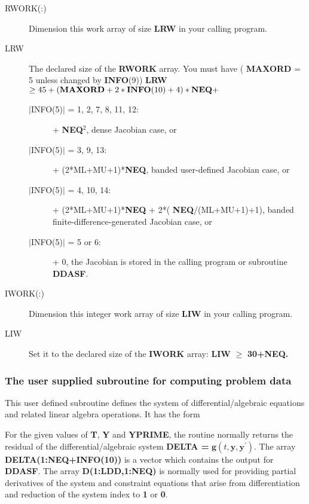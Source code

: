 \documentclass[twoside]{MATH77}
\begin{document}
\begin{description}
\item[RWORK(:)] Dimension this work array of size \textbf{LRW} in your calling
  program.
\item[LRW] The declared size of the \textbf{RWORK} array.  You must have ({\bf
    MAXORD} = 5 unless changed by {\bf INFO}(9)) \textbf{LRW} $\geq 45+({\bf
    MAXORD}+2*{\bf INFO}(10)+4)*{\bf NEQ} +$\vspace{-5pt}
  \begin{description}
  \item[$|$INFO(5)$|$ = 1, 2, 7, 8, 11, 12:] + {\bf NEQ}$^2$, dense Jacobian
    case, or
  \item[$|$INFO(5)$|$ = 3, 9, 13:]  + (2*ML+MU+1)*{\bf NEQ}, banded
    user-defined Jacobian case, or
  \item[ $|$INFO(5)$|$ = 4, 10, 14:] + (2*ML+MU+1)*{\bf NEQ} + 2*({\bf
      NEQ}/(ML+MU+1)+1), banded finite-difference-generated Jacobian case, or
  \item[$|$INFO(5)$|$ = 5 or 6:] + 0, the Jacobian is stored in the calling
    program or subroutine \textbf{DDASF}.
  \end{description}

\item[IWORK(:)] Dimension this integer work array of size
  \textbf{LIW} in your calling program.

\item[LIW] Set it to the declared size of the \textbf{IWORK} array:
  \textbf{LIW }$\geq$\textbf{ 30+NEQ.}

\end{description}

\subsubsection{The user supplied subroutine for computing problem data
  \label{DDASF}}

This user defined subroutine defines the system of differential/algebraic
equations and related linear algebra operations.  It has the form


For the given values of \textbf{T}, \textbf{Y} and \textbf{YPRIME}, the
routine normally returns the residual of the differential/algebraic system
\textbf{DELTA = }$\mathbf{g}(t,\mathbf{y},\mathbf{y}^{\prime }) .$ The array
\textbf{DELTA(1:NEQ+INFO(10))} is a vector which contains the output
for \textbf{DDASF}.  The array \textbf{D(1:LDD,1:NEQ)} is normally
used for providing partial derivatives of the system and constraint equations
that arise from differentiation and reduction of the system index to
\textbf{1} or \textbf{0}. 
\end{document}
